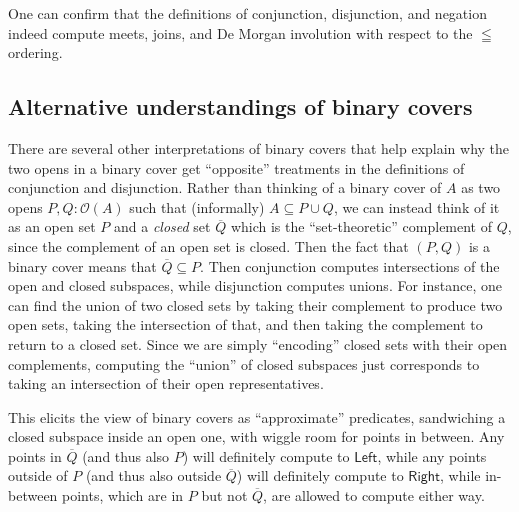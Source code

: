 \documentclass[conference]{IEEEtran}
\newcommand{\Open}[1]{\mathcal{O}({#1})}
\newcommand{\grammar}[1]{\textcolor{red}{\underline{#1}}}
\renewcommand{\grammar}[1]{#1}
\begin{document}
One can confirm that the definitions of conjunction, disjunction, and negation indeed compute meets, joins, and De Morgan involution with respect to the $\leqq$ ordering.

\subsection{Alternative understandings of binary covers}

There are several other interpretations of binary covers that help explain why the two opens in a binary cover get ``opposite'' treatments in the definitions of conjunction and disjunction. Rather than thinking of a binary cover of $A$ as two opens $P, Q : \Open{A}$ such that (informally) $A \subseteq P \cup Q$, we can instead think of it as an open set $P$ and a \emph{closed} set $\overline{Q}$ which is the ``set-theoretic'' complement of $Q$, since the complement of an open set is closed. Then the fact that $(P, Q)$ is a binary cover means that $\overline{Q} \subseteq P$. Then conjunction computes intersections of the open and closed subspaces, while disjunction computes unions.
For instance, one can find the union of two closed sets by taking their complement to produce two open sets, taking the intersection of that, and then taking the complement to return to a closed set. Since we are simply ``encoding'' closed sets with their open complements, computing the ``union'' of closed subspaces just corresponds to taking an intersection of their open representatives.

\grammar{This} elicits the view of binary covers as ``approximate'' predicates, sandwiching a closed subspace inside an open one, with wiggle room for points in between. Any points in $\overline{Q}$ (and thus also $P$) will definitely compute to $\mathsf{Left}$, while any points outside of $P$ (and thus also outside $\overline{Q}$) will definitely compute to $\mathsf{Right}$, while in-between points, which are in $P$ but not $\overline{Q}$, are allowed to compute either way.
\end{document}
